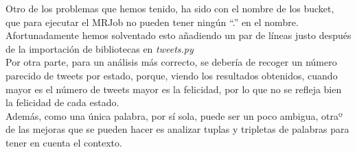 \documentclass[12pt,a4paper]{article}
\begin{document}
Otro de los problemas que hemos tenido, ha sido con el nombre de los bucket, que para ejecutar el MRJob no pueden tener ningún ``.'' en el nombre. Afortunadamente hemos solventado esto añadiendo un par de líneas justo después de la importación de bibliotecas en \textit{tweets.py}\\


Por otra parte, para un análisis más correcto, se debería de recoger un número parecido de tweets por estado, porque, viendo los resultados obtenidos, cuando mayor es el número de tweets mayor es la felicidad, por lo que no se refleja bien la felicidad de cada estado.\\
Además, como una única palabra, por sí sola, puede ser un poco ambigua, otraº de las mejoras que se pueden hacer es analizar tuplas y tripletas de palabras para tener en cuenta el contexto.\\
\end{document}
